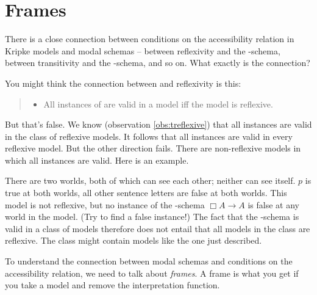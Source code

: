 

\section{Frames}\label{sec:frames}

There is a close connection between conditions on the accessibility relation in
Kripke models and modal schemas -- between reflexivity and the -schema,
between transitivity and the -schema, and so on. What exactly is the
connection?

You might think the connection between  and reflexivity is this:
\begin{quote}
  \begin{itemize}
    \item[(?)] All instances of  are valid in a model iff the model is reflexive.
  \end{itemize}
\end{quote}
%
But that's false. We know (observation \ref{obs:treflexive}) that all 
instances are valid in the class of reflexive models. It follows that all 
instances are valid in every reflexive model. But the other direction fails.
There are non-reflexive models in which all  instances are valid. Here is an example.
\begin{center}
\end{center}
There are two worlds, both of which can see each other; neither can see itself.
$p$ is true at both worlds, all other sentence letters are false at both worlds.
This model is not reflexive, but no instance of the -schema $\Box A \to A$
is false at any world in the model. (Try to find a false instance!) The fact
that the -schema is valid in a class of models therefore does not entail
that all models in the class are reflexive. The class might contain models like
the one just described.

To understand the connection between modal schemas and conditions on the
accessibility relation, we need to talk about \emph{frames}. A frame is what you
get if you take a model and remove the interpretation function.

